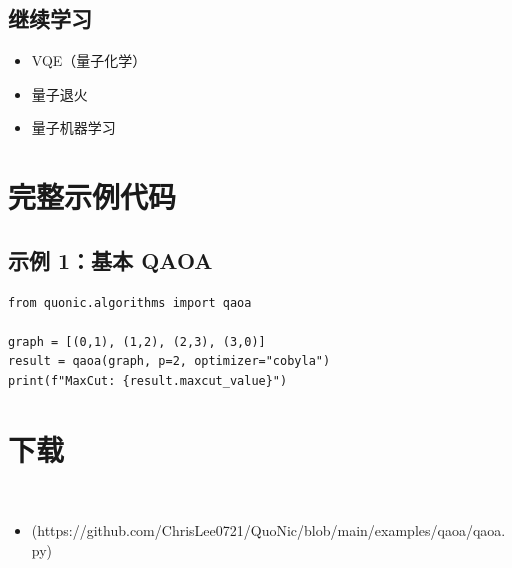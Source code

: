 \documentclass[12pt,a4paper]{article}
\begin{document}
\subsection{继续学习}
\begin{itemize}
  \item VQE（量子化学）
  \item 量子退火
  \item 量子机器学习
\end{itemize}

\section{完整示例代码}

\subsection{示例 1：基本 QAOA}

\begin{lstlisting}[style=python]
from quonic.algorithms import qaoa

graph = [(0,1), (1,2), (2,3), (3,0)]
result = qaoa(graph, p=2, optimizer="cobyla")
print(f"MaxCut: {result.maxcut_value}")
\end{lstlisting}


\section{下载}

\begin{itemize}
  \item [qaoa.py](https://github.com/ChrisLee0721/QuoNic/blob/main/examples/qaoa/qaoa.py)
\end{itemize}
\end{document}
